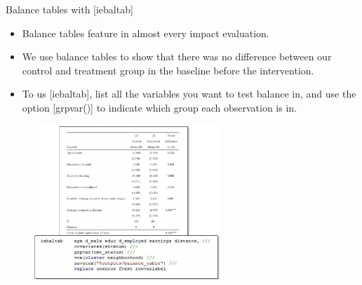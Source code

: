 \documentclass[aspectratio=169]{beamer}
\begin{document}
\begin{frame}{Balance tables with [iebaltab]}
	\begin{multicols}{2}	
		
		\begin{itemize}[<default overlay specification>]
			\item<1> Balance tables feature in almost every impact evaluation.
			\item<1> We use balance tables to show that there was no difference between our control and treatment group in the baseline before the intervention. 
			\item<1> To us [iebaltab], list all the variables you want to test balance in, and use the option [grpvar()] to indicate which group each observation is in.
		\end{itemize}
		
		\begin{figure}
			\centering
			\includegraphics[width=70mm]{img/Iebaltab}
		\end{figure}
		
	\end{multicols}
\end{frame}
\end{document}
